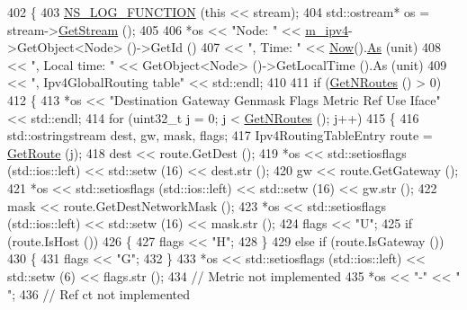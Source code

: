 \begin{DoxyCode}
402 \{
403   \hyperlink{log-macros-disabled_8h_a90b90d5bad1f39cb1b64923ea94c0761}{NS\_LOG\_FUNCTION} (\textcolor{keyword}{this} << stream);
404   std::ostream* os = stream->\hyperlink{classns3_1_1OutputStreamWrapper_a0cf30a4188ab6fdae2b2ab74db11acc2}{GetStream} ();
405 
406   *os << \textcolor{stringliteral}{"Node: "} << \hyperlink{classns3_1_1Ipv4GlobalRouting_a8ca97d33982a32fa41a98b56dbec2edc}{m\_ipv4}->GetObject<Node> ()->GetId ()
407       << \textcolor{stringliteral}{", Time: "} << \hyperlink{group__simulator_gac3635e2e87f7ce316c89290ee1b01d0d}{Now}().\hyperlink{classns3_1_1Time_a0bb1110638ce9938248bd07865a328ab}{As} (unit)
408       << \textcolor{stringliteral}{", Local time: "} << GetObject<Node> ()->GetLocalTime ().As (unit)
409       << \textcolor{stringliteral}{", Ipv4GlobalRouting table"} << std::endl;
410 
411   \textcolor{keywordflow}{if} (\hyperlink{classns3_1_1Ipv4GlobalRouting_abb9d2b3642272b9bd2697a5699922fa7}{GetNRoutes} () > 0)
412     \{
413       *os << \textcolor{stringliteral}{"Destination     Gateway         Genmask         Flags Metric Ref    Use Iface"} << std::endl;
414       \textcolor{keywordflow}{for} (uint32\_t j = 0; j < \hyperlink{classns3_1_1Ipv4GlobalRouting_abb9d2b3642272b9bd2697a5699922fa7}{GetNRoutes} (); j++)
415         \{
416           std::ostringstream dest, gw, mask, flags;
417           Ipv4RoutingTableEntry route = \hyperlink{classns3_1_1Ipv4GlobalRouting_accd518b9888908dbea189c1d1c73dcf1}{GetRoute} (j);
418           dest << route.GetDest ();
419           *os << std::setiosflags (std::ios::left) << std::setw (16) << dest.str ();
420           gw << route.GetGateway ();
421           *os << std::setiosflags (std::ios::left) << std::setw (16) << gw.str ();
422           mask << route.GetDestNetworkMask ();
423           *os << std::setiosflags (std::ios::left) << std::setw (16) << mask.str ();
424           flags << \textcolor{stringliteral}{"U"};
425           \textcolor{keywordflow}{if} (route.IsHost ())
426             \{
427               flags << \textcolor{stringliteral}{"H"};
428             \}
429           \textcolor{keywordflow}{else} \textcolor{keywordflow}{if} (route.IsGateway ())
430             \{
431               flags << \textcolor{stringliteral}{"G"};
432             \}
433           *os << std::setiosflags (std::ios::left) << std::setw (6) << flags.str ();
434           \textcolor{comment}{// Metric not implemented}
435           *os << \textcolor{stringliteral}{"-"} << \textcolor{stringliteral}{"      "};
436           \textcolor{comment}{// Ref ct not implemented}

\end{DoxyCode}
